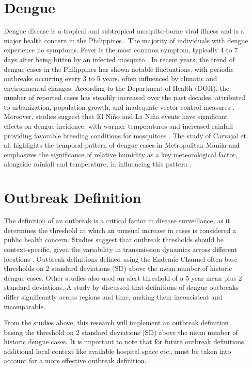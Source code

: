 \section{Dengue}
Dengue disease is a tropical and subtropical mosquito-borne viral illness and is a major health concern in the Philippines \cite{bravo2014epidemiology}. The majority of individuals with dengue experience no symptoms. Fever is the most common symptom, typically 4 to 7 days after being bitten by an infected mosquito \cite{zhou2024dengue}. In recent years, the trend of dengue cases in the Philippines has shown notable fluctuations, with periodic outbreaks occurring every 3 to 5 years, often influenced by climatic and environmental changes. According to the Department of Health (DOH), the number of reported cases has steadily increased over the past decades, attributed to urbanization, population growth, and inadequate vector control measures \cite{who2018philippines}. Moreover, studies suggest that El Niño and La Niña events have significant effects on dengue incidence, with warmer temperatures and increased rainfall providing favorable breeding conditions for mosquitoes \cite{watts2020climate}. The study of Carvajal et. al. highlights the temporal pattern of dengue cases in Metropolitan Manila and emphasizes the significance of relative humidity as a key meteorological factor, alongside rainfall and temperature, in influencing this pattern \cite{carvajal2018machine}.

\section{Outbreak Definition}
The definition of an outbreak is a critical factor in disease surveillance, as it determines the threshold at which an unusual increase in cases is considered a public health concern. Studies suggest that outbreak thresholds should be context-specific, given the variability in transmission dynamics across different locations \cite{runge2016dengue}. Outbreak definitions defined using the Endemic Channel often base thresholds on 2 standard deviations (SD) above the mean number of historic dengue cases. Other studies \cite{hemisphere2015update} also used an alert threshold of a 5-year mean plus 2 standard deviations. A study by \cite{brady2015dengue} discussed that definitions of dengue outbreaks differ significantly across regions and time, making them inconsistent and incomparable.

From the studies above, this research will implement an outbreak definition basing the threshold on 2 standard deviations (SD) above the mean number of historic dengue cases. It is important to note that for future outbreak definitions, additional local context like available hospital space etc., must be taken into account for a more effective outbreak definition.


